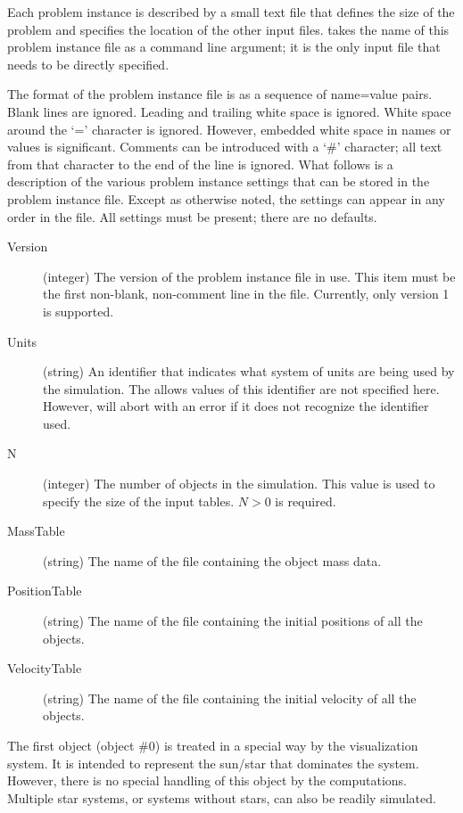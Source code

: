 Each problem instance is described by a small text file that defines the size of the problem and
specifies the location of the other input files.  takes the name of this
problem instance file as a command line argument; it is the only input file that needs to be
directly specified.

The format of the problem instance file is as a sequence of name=value pairs. Blank lines are
ignored. Leading and trailing white space is ignored. White space around the `=' character is
ignored. However, embedded white space in names or values is significant. Comments can be
introduced with a `\#' character; all text from that character to the end of the line is
ignored. What follows is a description of the various problem instance settings that can be
stored in the problem instance file. Except as otherwise noted, the settings can appear in any
order in the file. All settings must be present; there are no defaults.

\begin{description}
\item[Version] (integer) The version of the problem instance file in use. This item must be the
  first non-blank, non-comment line in the file. Currently, only version 1 is supported.
\item[Units] (string) An identifier that indicates what system of units are being used by the
  simulation. The allows values of this identifier are not specified here. However,
   will abort with an error if it does not recognize the identifier used.
\item[N] (integer) The number of objects in the simulation. This value is used to specify the
  size of the input tables. $N > 0$ is required.
\item[MassTable] (string) The name of the file containing the object mass data.
\item[PositionTable] (string) The name of the file containing the initial positions of all the
  objects.
\item[VelocityTable] (string) The name of the file containing the initial velocity of all the
  objects.
\end{description}

The first object (object \#0) is treated in a special way by the visualization system. It is
intended to represent the sun/star that dominates the system. However, there is no special
handling of this object by the computations. Multiple star systems, or systems without stars,
can also be readily simulated.

